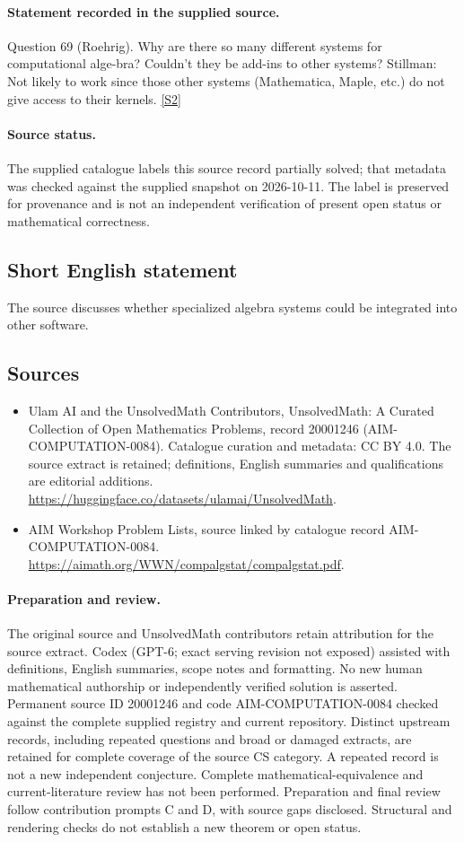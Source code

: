 \documentclass[11pt]{article}
\begin{document}
\paragraph{Statement recorded in the supplied source.}
Question 69 (Roehrig). Why are there so many different systems for computational alge-bra? Couldn't they be add-ins to other systems? Stillman: Not likely to work since those other systems (Mathematica, Maple, etc.) do not give access to their kernels. \href{https://aimath.org/WWN/compalgstat/compalgstat.pdf}{[S2]}
\paragraph{Source status.}
The supplied catalogue labels this source record partially solved; that metadata was checked against the supplied snapshot on 2026-10-11. The label is preserved for provenance and is not an independent verification of present open status or mathematical correctness.
\subsection{Short English statement}
The source discusses whether specialized algebra systems could be integrated into other software.
\subsection{Sources}
\begin{itemize}
\item[S1] Ulam AI and the UnsolvedMath Contributors, UnsolvedMath: A Curated Collection of Open Mathematics Problems, record 20001246 (AIM-COMPUTATION-0084). Catalogue curation and metadata: CC BY 4.0. The source extract is retained; definitions, English summaries and qualifications are editorial additions.
\url{https://huggingface.co/datasets/ulamai/UnsolvedMath}.
\item[S2] AIM Workshop Problem Lists, source linked by catalogue record AIM-COMPUTATION-0084.
\url{https://aimath.org/WWN/compalgstat/compalgstat.pdf}.
\end{itemize}
\paragraph{Preparation and review.}
The original source and UnsolvedMath contributors retain attribution for the source extract. Codex (GPT-6; exact serving revision not exposed) assisted with definitions, English summaries, scope notes and formatting. No new human mathematical authorship or independently verified solution is asserted. Permanent source ID 20001246 and code AIM-COMPUTATION-0084 checked against the complete supplied registry and current repository. Distinct upstream records, including repeated questions and broad or damaged extracts, are retained for complete coverage of the source CS category. A repeated record is not a new independent conjecture. Complete mathematical-equivalence and current-literature review has not been performed. Preparation and final review follow contribution prompts C and D, with source gaps disclosed. Structural and rendering checks do not establish a new theorem or open status.
\label{end:20001246}
\end{document}

